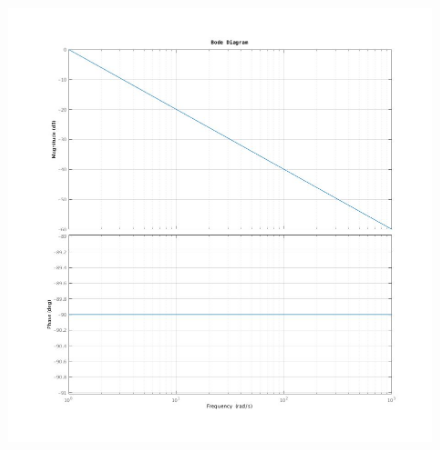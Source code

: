 \documentclass{article}
\begin{document}
			\begin{figure}[h!]
				\centering
				\includegraphics[scale=0.4]{./pictures/termine_monomio.jpg}
			\end{figure}

		\newpage
\end{document}
